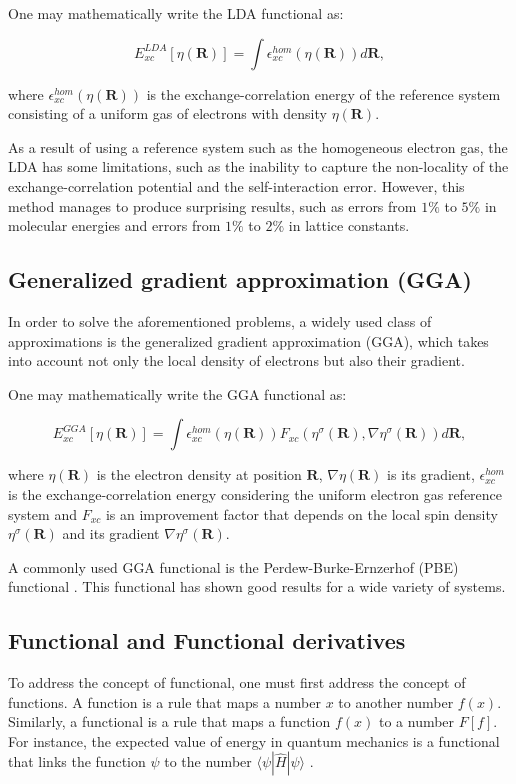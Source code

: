 One may mathematically write the LDA functional as:

\begin{equation}
E_{xc}^{LDA}[\eta(\mathbf{R})] = \int \epsilon_{xc}^{hom}(\eta(\mathbf{R})) d\mathbf{R},
\end{equation}

where $\epsilon_{xc}^{hom}(\eta(\mathbf{R}))$ is the exchange-correlation energy of the reference system consisting of a uniform gas of electrons with density $\eta(\mathbf{R})$.

As a result of using a reference system such as the homogeneous electron gas, the LDA has some limitations, such as the inability to capture the non-locality of the exchange-correlation potential and the self-interaction error. However, this method manages to produce surprising results, such as errors from $1\%$ to $5\%$ in molecular energies and errors from $1\%$ to $2\%$ in \cite{DFTCoursera} lattice constants.


\subsection{Generalized gradient approximation (GGA)}
In order to solve the aforementioned problems, a widely used class of approximations is the generalized gradient approximation (GGA), which takes into account not only the local density of electrons but also their gradient.

One may mathematically write the GGA functional as:

\begin{equation}
E_{xc}^{GGA}[\eta (\mathbf{R})] = \int \epsilon_{xc}^{hom}(\eta(\mathbf{R}))F_{xc}(\eta^ {\sigma}(\mathbf{R}), \nabla \eta^{\sigma}(\mathbf{R})) d\mathbf{R},
\end{equation}

where $\eta(\mathbf{R})$ is the electron density at position $\mathbf{R}$, $\nabla\eta(\mathbf{R})$ is its gradient, $\epsilon_ {xc}^{hom}$ is the exchange-correlation energy considering the uniform electron gas reference system and $F_{xc}$ is an improvement factor that depends on the local spin density $\eta^{\sigma}(\mathbf{R})$ and its gradient $\nabla\eta^{\sigma}(\mathbf{R})$.

A commonly used GGA functional is the Perdew-Burke-Ernzerhof (PBE) functional \cite{PhysRevLett.77.3865}. This functional has shown good results for a wide variety of systems.

\subsection{Functional and Functional derivatives}
To address the concept of functional, one must first address the concept of functions. A function is a rule that maps a number $x$ to another number $f(x)$. Similarly, a functional is a rule that maps a function $f(x)$ to a number $F[f]$. For instance, the expected value of energy in quantum mechanics is a functional that links the function $\psi$ to the number $\langle \psi | \hat{H} | \psi \rangle$ \cite{parr1994density}.

